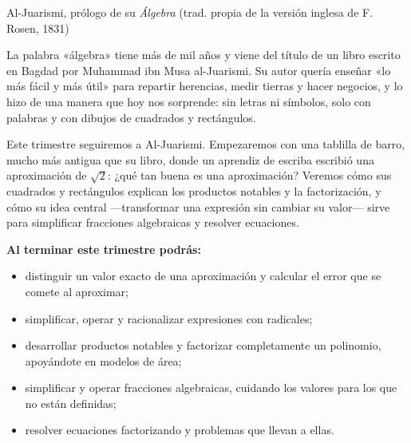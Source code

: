 \documentclass[11pt]{article}
\begin{document}
\encabezado

{Al-Juarismi, prólogo de su \emph{Álgebra} (trad. propia de la versión inglesa de F. Rosen, 1831)}


La palabra «álgebra» tiene más de mil años y viene del título de un libro
escrito en Bagdad por Muhammad ibn Musa al-Juarismi. Su autor quería enseñar
«lo más fácil y más útil» para repartir herencias, medir tierras y hacer
negocios, y lo hizo de una manera que hoy nos sorprende: sin letras ni
símbolos, solo con palabras y con dibujos de cuadrados y rectángulos.

Este trimestre seguiremos a Al-Juarismi. Empezaremos con una tablilla de
barro, mucho más antigua que su libro, donde un aprendiz de escriba escribió
una aproximación de $\sqrt{2}$: ¿qué tan buena es una aproximación?
Veremos cómo sus cuadrados y rectángulos explican los productos notables y la
factorización, y cómo su idea central —transformar una expresión sin cambiar
su valor— sirve para simplificar fracciones algebraicas y resolver ecuaciones.

\textbf{Al terminar este trimestre podrás:}
\begin{itemize}
  \item distinguir un valor exacto de una aproximación y calcular el error
        que se comete al aproximar;
  \item simplificar, operar y racionalizar expresiones con radicales;
  \item desarrollar productos notables y factorizar completamente un
        polinomio, apoyándote en modelos de área;
  \item simplificar y operar fracciones algebraicas, cuidando los valores
        para los que no están definidas;
  \item resolver ecuaciones factorizando y problemas que llevan a ellas.
\end{itemize}
\end{document}
